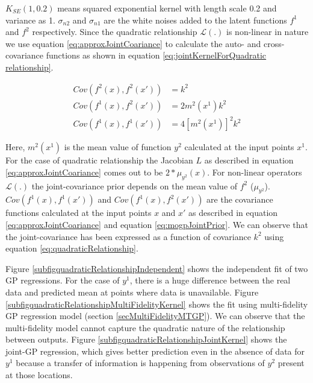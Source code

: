 \(K_{SE}(1, 0.2)\) means squared exponential kernel with length scale 0.2 and variance as 1. \(\sigma_{n2}\) and \(\sigma_{n1}\) are the white noises added to the latent functions \(f^{1}\) and \(f^{2}\) respectively. Since the quadratic relationship \(\mathcal{L}(.)\) is non-linear in nature we use equation \ref{eq:approxJointCoariance} to calculate the auto- and cross-covariance functions as shown in equation \ref{eq:jointKernelForQuadratic relationship}. 

\begin{equation}\label{eq:jointKernelForQuadratic relationship}
    \begin{aligned}
Cov(f^2(x), f^2(x')) & = k^{2} \\    
Cov(f^1(x), f^2(x')) & = 2m^{2}(x^{1}) k^{2} \\
Cov(f^1(x), f^1(x')) & = 4 \left [m^{2}(x^{1}) \right ]^2 k^{2}
    \end{aligned}
\end{equation}

Here, \(m^2(x^{1})\) is the mean value of function \(y^{2}\) calculated at the input points \(x^{1}\). For the case of quadratic relationship the Jacobian \(L\) as described in equation \ref{eq:approxJointCoariance} comes out to be \(2*\mu_{y^{2}}(x)\). For non-linear operators \(\mathcal{L}(.)\) the joint-covariance prior depends on the mean value of \(f^{2}\) ($\mu_{y^{2}}$). \(Cov(f^1(x), f^1(x'))\) and \(Cov(f^1(x), f^2(x'))\) are the covariance functions calculated at the input points \(x\) and \(x'\) as described in equation \ref{eq:approxJointCoariance} and equation \ref{eq:mogpJointPrior}. We can observe that the joint-covariance has been expressed as a function of covariance \(k^2\) using equation \ref{eq:quadraticRelationship}.  


Figure \ref{subfigquadraticRelationshipIndependent} shows the independent fit of two GP regressions. For the case of \(y^{1}\), there is a huge difference between the real data and predicted mean at points where data is unavailable. Figure \ref{subfigquadraticRelationshipMultiFidelityKernel} shows the fit using multi-fidelity GP regression model (section \ref{secMultiFidelityMTGP}). We can observe that the multi-fidelity model cannot capture the quadratic nature of the relationship between outputs. Figure \ref{subfigquadraticRelationshipJointKernel} shows the joint-GP regression, which gives better prediction even in the absence of data for \(y^{1}\) because a transfer of information is happening from observations of \(y^{2}\) present at those locations. 


